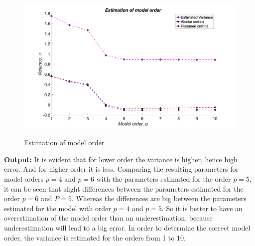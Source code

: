 \begin{figure}[H]
\centering
{\includegraphics[scale=0.15]{ass6_1.png}}
\caption{Estimation of model order }
\label{Estimation of model order}
\end{figure}

 \noindent \textbf{Output:} 
 \noindent It is evident that for lower order the variance is higher, hence high error. And for higher order it is less. Comparing the resulting parameters for model orders $p=4$ and $p=6$ with the parameters estimated for the order $p=5$, it can be seen that slight differences between the parameters estimated for the order $p=6$ and $P=5.$ Whereas the differences are big between the parameters estimated for the model with order $p=4$ and $p=5.$ So it is better to have an overestimation of the model order than an underestimation, because underestimation will lead to a big error. In order to determine the correct model order, the variance is estimated for the orders from 1 to 10. 

